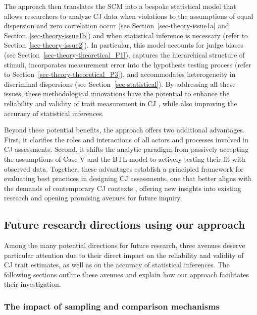 \documentclass[
  authoryear,
  review,
  1p]{elsarticle}
\begin{document}
The approach then translates the SCM into a bespoke statistical model
that allows researchers to analyze CJ data when violations to the
assumptions of equal dispersion and zero correlation occur (see
Section~\ref{sec-theory-issue1a} and Section~\ref{sec-theory-issue1b})
and when statistical inference is necessary (refer to
Section~\ref{sec-theory-issue2}). In particular, this model accounts for
judge biases (see Section~\ref{sec-theory-theoretical_P1}), captures the
hierarchical structure of stimuli, incorporates measurement error into
the hypothesis testing process (refer to
Section~\ref{sec-theory-theoretical_P3}), and accommodates heterogeneity
in discriminal dispersions (see Section~\ref{sec-statistical}). By
addressing all these issues, these methodological innovations have the
potential to enhance the reliability and validity of trait measurement
in CJ \citep{Perron_et_al_2015}, while also improving the accuracy of
statistical inferences.

Beyond these potential benefits, the approach offers two additional
advantages. First, it clarifies the roles and interactions of all actors
and processes involved in CJ assessments. Second, it shifts the analytic
paradigm from passively accepting the assumptions of Case V and the BTL
model to actively testing their fit with observed data. Together, these
advantages establish a principled framework for evaluating best
practices in designing CJ assessments, one that better aligns with the
demands of contemporary CJ contexts \citep{Kelly_et_al_2022}, offering
new insights into existing research and opening promising avenues for
future inquiry.

\subsection{Future research directions using our
approach}\label{sec-discussion_RA}

Among the many potential directions for future research, three avenues
deserve particular attention due to their direct impact on the
reliability and validity of CJ trait estimates, as well as on the
accuracy of statistical inferences. The following sections outline these
avenues and explain how our approach facilitates their investigation.

\subsubsection{The impact of sampling and comparison
mechanisms}\label{sec-discussion_RA1}
\end{document}
